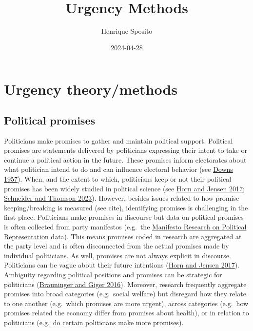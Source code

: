 \documentclass[
]{article}
\title{Urgency Methods}
\author{Henrique Sposito}
\date{2024-04-28}
\begin{document}
\maketitle

\hypertarget{urgency-theorymethods}{%
\section{Urgency theory/methods}\label{urgency-theorymethods}}

\hypertarget{political-promises}{%
\subsection{Political promises}\label{political-promises}}

Politicians make promises to gather and maintain political support.
Political promises are statements delivered by politicians expressing
their intent to take or continue a political action in the future. These
promises inform electorates about what politician intend to do and can
influence electoral behavior (see
\href{https://www.jstor.org/stable/pdf/1827369.pdf}{Downs 1957}). When,
and the extent to which, politicians keep or not their political
promises has been widely studied in political science (see
\href{https://ejpr.onlinelibrary.wiley.com/doi/abs/10.1111/1475-6765.12173}{Horn
and Jensen 2017};
\href{https://onlinelibrary.wiley.com/doi/10.1111/ajps.12789}{Schneider
and Thomson 2023}). However, besides issues related to how promise
keeping/breaking is measured (see cite), identifying promises is
challenging in the first place. Politicians make promises in discourse
but data on political promises is often collected from party manifestos
(e.g.~the
\href{https://manifesto-project.wzb.eu/information/documents/cmp_emp_mapping}{Manifesto
Research on Political Representation} data). This means promises coded
in research are aggregated at the party level and is often disconnected
from the actual promises made by individual politicians. As well,
promises are not always explicit in discourse. Politicians can be vague
about their future intentions
(\href{https://ejpr.onlinelibrary.wiley.com/doi/abs/10.1111/1475-6765.12173}{Horn
and Jensen 2017}). Ambiguity regarding political positions and promises
can be strategic for politicians
(\href{https://www.cambridge.org/core/services/aop-cambridge-core/content/view/D0D301CD53950B2D7C9BC6B492D413B1/S2049847016000182a.pdf/strategic-ambiguity-of-party-positions-in-multi-party-competition.pdf}{Brauninger
and Giger 2016}). Moreover, research frequently aggregate promises into
broad categories (e.g.~social welfare) but disregard how they relate to
one another (e.g.~which promises are more urgent), across categories
(e.g.~how promises related the economy differ from promises about
health), or in relation to politicians (e.g.~do certain politicians make
more promises).
\end{document}
